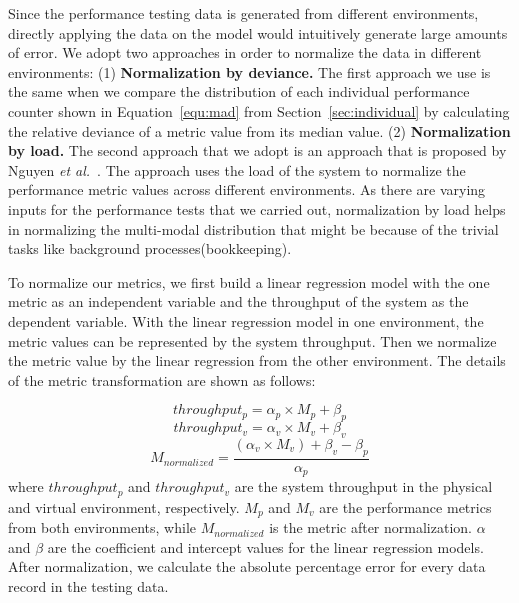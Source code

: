 \documentclass[smallextended]{svjour3}       %
\begin{document}
Since the performance testing data is generated from different environments, directly applying the data on the model would intuitively generate large amounts of error. We adopt two approaches in order to normalize the data in different environments: (1) \textbf{Normalization by deviance.} The first approach we use is the same when we compare the distribution of each individual performance counter shown in Equation~\ref{equ:mad} from Section~\ref{sec:individual} by calculating the relative deviance of a metric value from its median value. (2) \textbf{Normalization by load.} The second approach that we adopt is an approach that is proposed by Nguyen \textit{et al.}~\cite{Nguyen:2012:ADP:2188286.2188344}. The approach uses the load of the system to normalize the performance metric values across different environments. As there are varying inputs for the performance tests that we carried out, normalization by load helps in normalizing the multi-modal distribution that might be because of the trivial tasks like background processes(bookkeeping).



To normalize our metrics, we first build a linear regression model with the one metric as an independent variable and the throughput of the system as the dependent variable. With the linear regression model in one environment, the metric values can be represented by the system throughput. Then we normalize the metric value by the linear regression from the other environment. The details of the metric transformation are shown as follows:

\begin{equation*}
throughput_{p}= \alpha_{p} \times M_{p} + \beta_{p}
\end{equation*}
\vspace{-0.4cm}
\begin{equation*}
throughput_{v}= \alpha_{v} \times M_{v} + \beta_{v}
\end{equation*}
\vspace{-0.4cm}
\begin{equation*}
M_{normalized} = \frac{(\alpha_{v} \times M_{v})+\beta_{v}-\beta_{p}}{\alpha_{p}}
\end{equation*}
where $throughput_{p}$ and $throughput_{v}$ are the system throughput in the physical and virtual environment, respectively. $M_{p}$ and $M_{v}$ are the performance metrics from both environments, while $M_{normalized}$ is the metric after normalization. $\alpha$ and $\beta$ are the coefficient and intercept values for the linear regression models. After normalization, we calculate the absolute percentage error for every data record in the testing data.
\end{document}
